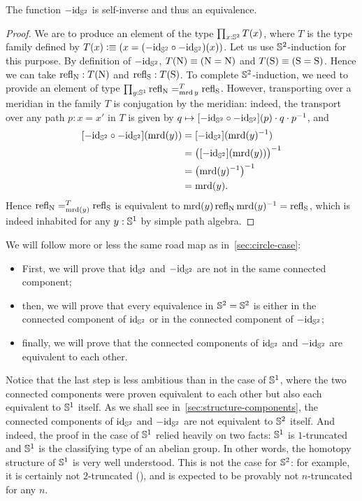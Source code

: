 \documentclass[english,a4paper]{lmcs}
\begin{document}
\begin{lem}
  The function $-\mathord{\mathrm{id}}_{{\mathbb S^{2}}}$ is self-inverse and thus an equivalence.
  \label{lem:minus-id-equivalence}
\end{lem}
\begin{proof}
  We are to produce an element of the type $\prod_{x:{{\mathbb S^{2}}}}T(x)$,
  where $T$ is the type family defined by
  $T(x)\vcentcolon\equiv (x= (-\mathord{\mathrm{id}}_{{\mathbb S^{2}}} \circ -\mathord{\mathrm{id}}_{{\mathbb S^{2}}})(x))$.
  Let us use ${{\mathbb S^{2}}}$-induction for this purpose.
  By definition of $-\mathord{\mathrm{id}}_{{\mathbb S^{2}}}$,
  $T(\mathrm{N}) \equiv (\mathrm{N}=\mathrm{N})$
  and $T(\mathrm{S}) \equiv (\mathrm{S}=\mathrm{S})$.
  Hence we can take $\mathop{{\mathrm{refl}}_{\mathrm{N}}}:T(\mathrm{N})$
  and $\mathop{{\mathrm{refl}}_{\mathrm{S}}}:T(\mathrm{S})$.
  To complete ${{\mathbb S^{2}}}$-induction, we need to provide an element
  of type $\prod_{y:{{\mathbb S^{1}}}} \mathop{{\mathrm{refl}}_{\mathrm{N}}} =^{T}_{\operatorname{\mathrm{mrd}} y} \mathop{{\mathrm{refl}}_{\mathrm{S}}}$.
  However,
  transporting over a meridian in the family $T$ is conjugation by the
  meridian: indeed, the transport over any path $p:x=x'$ in $T$ is given by
  $q\mapsto \mathop{\left[{-\mathord{\mathrm{id}}_{{\mathbb S^{2}}} \circ -\mathord{\mathrm{id}}_{{\mathbb S^{2}}}}\right]}(p) \cdot q \cdot p^{-1}$, and
  \begin{align*}
    \ap{-\id_\Sp \circ -\id_\Sp} (\mrd(y))
     &= \ap{-\id_\Sp}(\inv {\mrd(y)})
    \\ &= \inv {\bigl( \ap{-\id_\Sp}(\mrd(y)) \bigr)}
    \\ &= \inv { \left( \inv{\mrd(y)} \right) }
    \\ &= \mrd(y).
  \end{align*}
  Hence $\mathop{{\mathrm{refl}}_{\mathrm{N}}} =^{T}_{\operatorname{\mathrm{mrd}}(y)} \mathop{{\mathrm{refl}}_{\mathrm{S}}}$
  is equivalent to
  $\operatorname{\mathrm{mrd}}(y)\mathop{{\mathrm{refl}}_{\mathrm{N}}} \operatorname{\mathrm{mrd}}(y)^{-1} = \mathop{{\mathrm{refl}}_{\mathrm{S}}}$, which is indeed inhabited for any
  $y:{{\mathbb S^{1}}}$ by simple path algebra.
\end{proof}

We will follow more or less the same road map as
in~\cref{sec:circle-case}:
\begin{itemize}
\item First, we will prove that $\mathord{\mathrm{id}}_{{\mathbb S^{2}}}$ and $-\mathord{\mathrm{id}}_{{\mathbb S^{2}}}$ are not in
  the same connected component;
\item then, we will prove that every equivalence in ${{\mathbb S^{2}}}={{\mathbb S^{2}}}$ is
  either in the connected component of $\mathord{\mathrm{id}}_{{\mathbb S^{2}}}$ or in the connected
  component of $-\mathord{\mathrm{id}}_{{\mathbb S^{2}}}$;
\item finally, we will prove that the connected components of $\mathord{\mathrm{id}}_{{\mathbb S^{2}}}$
  and $-\mathord{\mathrm{id}}_{{\mathbb S^{2}}}$ are equivalent to each other.
\end{itemize}
Notice that the last step is less ambitious than in the case of ${{\mathbb S^{1}}}$,
where the two connected components were proven equivalent to each
other but also each equivalent to ${{\mathbb S^{1}}}$ itself.
As we shall see in~\cref{sec:structure-components}, the connected
components of $\mathord{\mathrm{id}}_{{\mathbb S^{2}}}$ and $-\mathord{\mathrm{id}}_{{\mathbb S^{2}}}$ are not equivalent to ${{\mathbb S^{2}}}$
itself.
And indeed, the proof in the case of ${{\mathbb S^{1}}}$ relied heavily on two
facts: ${{\mathbb S^{1}}}$ is $1$-truncated and ${{\mathbb S^{1}}}$ is the classifying type of an
abelian group. In other words, the homotopy structure of ${{\mathbb S^{1}}}$ is very
well understood. This is not the case for ${{\mathbb S^{2}}}$: for example, it is
certainly not $2$-truncated (\cite{brunerie:thesis}), and is expected
to be provably not $n$-truncated for any $n$.
\end{document}
